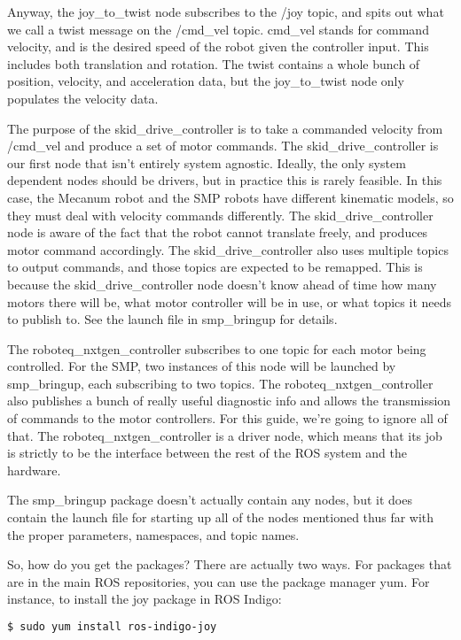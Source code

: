 Anyway, the joy\_to\_twist node subscribes to the /joy topic, and spits out what we call a twist message on the /cmd\_vel topic. cmd\_vel stands for command velocity, and is the desired speed of the robot given the controller input. This includes both translation and rotation. The twist contains a whole bunch of position, velocity, and acceleration data, but the joy\_to\_twist node only populates the velocity data.

The purpose of the skid\_drive\_controller is to take a commanded velocity from /cmd\_vel and produce a set of motor commands. The skid\_drive\_controller is our first node that isn't entirely system agnostic. Ideally, the only system dependent nodes should be drivers, but in practice this is rarely feasible. In this case, the Mecanum robot and the SMP robots have different kinematic models, so they must deal with velocity commands differently. The skid\_drive\_controller node is aware of the fact that the robot cannot translate freely, and produces motor command accordingly. The skid\_drive\_controller also uses multiple topics to output commands, and those topics are expected to be remapped. This is because the skid\_drive\_controller node doesn't know ahead of time how many motors there will be, what motor controller will be in use, or what topics it needs to publish to. See the launch file in smp\_bringup for details.

The roboteq\_nxtgen\_controller subscribes to one topic for each motor being controlled. For the SMP, two instances of this node will be launched by smp\_bringup, each subscribing to two topics. The roboteq\_nxtgen\_controller also publishes a bunch of really useful diagnostic info and allows the transmission of commands to the motor controllers. For this guide, we're going to ignore all of that. The roboteq\_nxtgen\_controller is a driver node, which means that its job is strictly to be the interface between the rest of the ROS system and the hardware.

The smp\_bringup package doesn't actually contain any nodes, but it does contain the launch file for starting up all of the nodes mentioned thus far with the proper parameters, namespaces, and topic names.

So, how do you get the packages? There are actually two ways. For packages that are in the main ROS repositories, you can use the package manager yum. For instance, to install the joy package in ROS Indigo:

\begin{lstlisting}[language=bash]
  $ sudo yum install ros-indigo-joy
\end{lstlisting}

